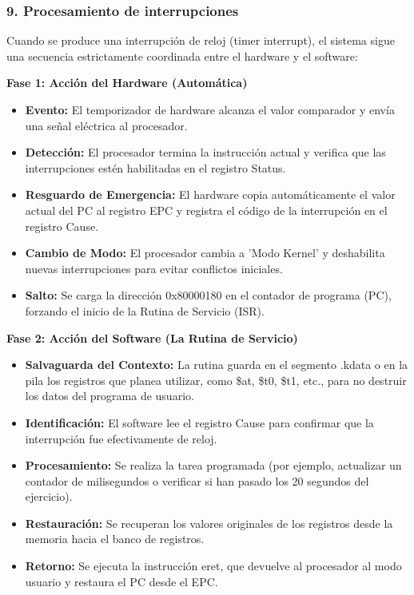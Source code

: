 \documentclass[12pt,a4paper]{article}
\begin{document}
\subsubsection{9. Procesamiento de interrupciones}

Cuando se produce una interrupción de reloj (timer interrupt), el sistema sigue una secuencia estrictamente coordinada entre el hardware y el software:

\textbf{Fase 1: Acción del Hardware (Automática)}
\begin{itemize}
    \item \textbf{Evento:} El temporizador de hardware alcanza el valor comparador y envía una señal eléctrica al procesador.
    \item \textbf{Detección:} El procesador termina la instrucción actual y verifica que las interrupciones estén habilitadas en el registro Status.
    \item \textbf{Resguardo de Emergencia:} El hardware copia automáticamente el valor actual del PC al registro EPC y registra el código de la interrupción en el registro Cause.
    \item \textbf{Cambio de Modo:} El procesador cambia a 'Modo Kernel' y deshabilita nuevas interrupciones para evitar conflictos iniciales.
    \item \textbf{Salto:} Se carga la dirección 0x80000180 en el contador de programa (PC), forzando el inicio de la Rutina de Servicio (ISR).
\end{itemize}

\textbf{Fase 2: Acción del Software (La Rutina de Servicio)}
\begin{itemize}
    \item \textbf{Salvaguarda del Contexto:} La rutina guarda en el segmento .kdata o en la pila los registros que planea utilizar, como \$at, \$t0, \$t1, etc., para no destruir los datos del programa de usuario.
    \item \textbf{Identificación:} El software lee el registro Cause para confirmar que la interrupción fue efectivamente de reloj.
    \item \textbf{Procesamiento:} Se realiza la tarea programada (por ejemplo, actualizar un contador de milisegundos o verificar si han pasado los 20 segundos del ejercicio).
    \item \textbf{Restauración:} Se recuperan los valores originales de los registros desde la memoria hacia el banco de registros.
    \item \textbf{Retorno:} Se ejecuta la instrucción eret, que devuelve al procesador al modo usuario y restaura el PC desde el EPC.
\end{itemize}
\end{document}
